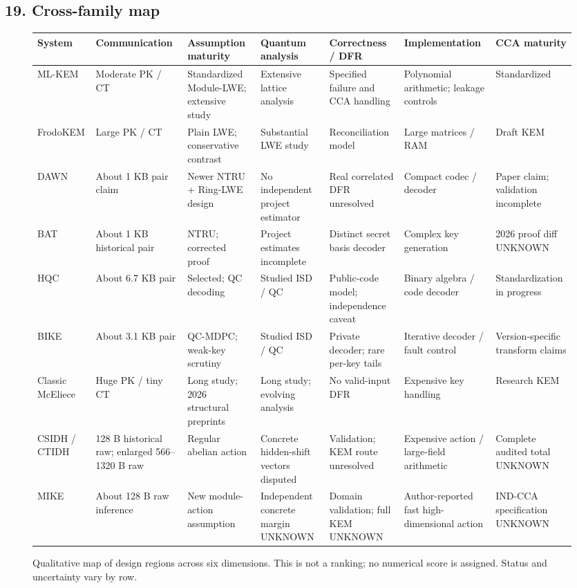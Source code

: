 \documentclass[
  10pt,
  a4paper,
]{article}
\begin{document}
\begin{landscape}\subsection{19. Cross-family map}\begin{figure}[htbp]\centering\small\setlength{\tabcolsep}{4pt}\renewcommand{\arraystretch}{1.3}
\begin{tabular}{p{2.1cm}p{2.8cm}p{3.2cm}p{3cm}p{3.1cm}p{3cm}p{3.1cm}}\toprule System & Communication & Assumption maturity & Quantum analysis & Correctness / DFR & Implementation & CCA maturity \\ \midrule
ML-KEM & Moderate PK / CT & Standardized Module-LWE; extensive study & Extensive lattice analysis & Specified failure and CCA handling & Polynomial arithmetic; leakage controls & Standardized \\
FrodoKEM & Large PK / CT & Plain LWE; conservative contrast & Substantial LWE study & Reconciliation model & Large matrices / RAM & Draft KEM \\
DAWN & About 1 KB pair claim & Newer NTRU + Ring-LWE design & No independent project estimator & Real correlated DFR unresolved & Compact codec / decoder & Paper claim; validation incomplete \\
BAT & About 1 KB historical pair & NTRU; corrected proof & Project estimates incomplete & Distinct secret basis decoder & Complex key generation & 2026 proof diff UNKNOWN \\
HQC & About 6.7 KB pair & Selected; QC decoding & Studied ISD / QC & Public-code model; independence caveat & Binary algebra / code decoder & Standardization in progress \\
BIKE & About 3.1 KB pair & QC-MDPC; weak-key scrutiny & Studied ISD / QC & Private decoder; rare per-key tails & Iterative decoder / fault control & Version-specific transform claims \\
Classic McEliece & Huge PK / tiny CT & Long study; 2026 structural preprints & Long study; evolving analysis & No valid-input DFR & Expensive key handling & Research KEM \\
CSIDH / CTIDH & 128 B historical raw; enlarged 566--1320 B raw & Regular abelian action & Concrete hidden-shift vectors disputed & Validation; KEM route unresolved & Expensive action / large-field arithmetic & Complete audited total UNKNOWN \\
MIKE & About 128 B raw inference & New module-action assumption & Independent concrete margin UNKNOWN & Domain validation; full KEM UNKNOWN & Author-reported fast high-dimensional action & IND-CCA specification UNKNOWN \\
\bottomrule\end{tabular}\caption{Qualitative map of design regions across six dimensions. This is not a ranking; no numerical score is assigned. Status and uncertainty vary by row.}\label{fig:map}\end{figure}\end{landscape}
\end{document}
